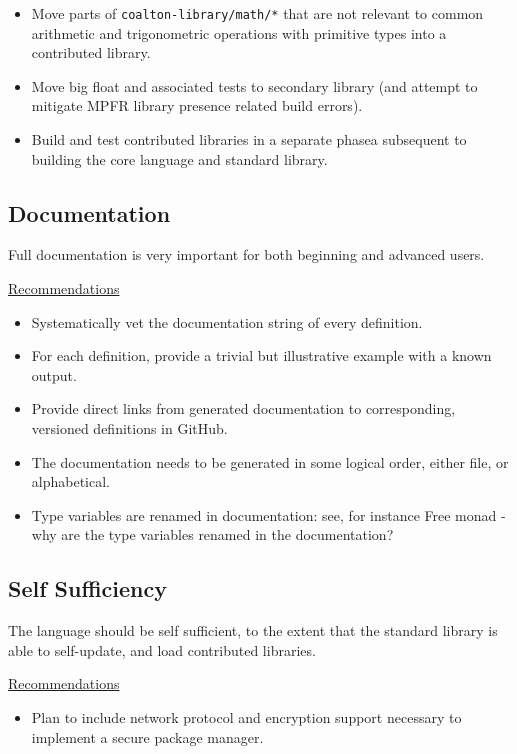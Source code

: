 \documentclass[12pt]{article}
\newcommand{\code}{\texttt}
\begin{document}
\begin{itemize}
\item Move parts of \code{coalton-library/math/*} that are not
  relevant to common arithmetic and trigonometric operations with
  primitive types into a contributed library.
\item Move big float and associated tests to secondary library (and
  attempt to mitigate MPFR library presence related build errors).
\item Build and test contributed libraries in a separate phasea
  subsequent to building the core language and standard library.
\end{itemize}

\subsection{Documentation}

Full documentation is very important for both beginning and advanced
users.

\bigskip
\underline{Recommendations}

\begin{itemize}
\item Systematically vet the documentation string of every definition.
\item For each definition, provide a trivial but illustrative example
  with a known output.
\item Provide direct links from generated documentation to
  corresponding, versioned definitions in GitHub.
\item The documentation needs to be generated in some logical order,
  either file, or alphabetical.
\item Type variables are renamed in documentation: see, for instance 
Free monad - why are the type variables renamed in the documentation?


\end{itemize}

\subsection{Self Sufficiency}

The language should be self sufficient, to the extent that the
standard library is able to self-update, and load contributed
libraries.

\bigskip
\underline{Recommendations}

\begin{itemize}
\item Plan to include network protocol and encryption support
  necessary to implement a secure package manager.
\end{itemize}
\end{document}
